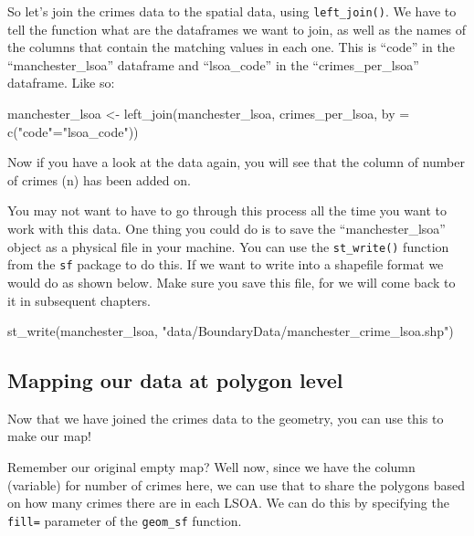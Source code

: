 \documentclass[
]{book}
\newenvironment{Shaded}{\begin{snugshade}}{\end{snugshade}}
\newcommand{\AttributeTok}[1]{\textcolor[rgb]{0.77,0.63,0.00}{#1}}
\newcommand{\FunctionTok}[1]{\textcolor[rgb]{0.00,0.00,0.00}{#1}}
\newcommand{\NormalTok}[1]{#1}
\newcommand{\OtherTok}[1]{\textcolor[rgb]{0.56,0.35,0.01}{#1}}
\newcommand{\StringTok}[1]{\textcolor[rgb]{0.31,0.60,0.02}{#1}}
\begin{document}
So let's join the crimes data to the spatial data, using \texttt{left\_join()}. We have to tell the function what are the dataframes we want to join, as well as the names of the columns that contain the matching values in each one. This is ``code'' in the ``manchester\_lsoa'' dataframe and ``lsoa\_code'' in the ``crimes\_per\_lsoa'' dataframe. Like so:

\begin{Shaded}
\begin{Highlighting}[]
\NormalTok{manchester\_lsoa }\OtherTok{\textless{}{-}} \FunctionTok{left\_join}\NormalTok{(manchester\_lsoa, crimes\_per\_lsoa, }\AttributeTok{by =} \FunctionTok{c}\NormalTok{(}\StringTok{"code"}\OtherTok{=}\StringTok{"lsoa\_code"}\NormalTok{))}
\end{Highlighting}
\end{Shaded}

Now if you have a look at the data again, you will see that the column of number of crimes (n) has been added on.

You may not want to have to go through this process all the time you want to work with this data. One thing you could do is to save the ``manchester\_lsoa'' object as a physical file in your machine. You can use the \texttt{st\_write()} function from the \texttt{sf} package to do this. If we want to write into a shapefile format we would do as shown below. Make sure you save this file, for we will come back to it in subsequent chapters.

\begin{Shaded}
\begin{Highlighting}[]
\FunctionTok{st\_write}\NormalTok{(manchester\_lsoa, }\StringTok{"data/BoundaryData/manchester\_crime\_lsoa.shp"}\NormalTok{)}
\end{Highlighting}
\end{Shaded}

\hypertarget{mapping-our-data-at-polygon-level}{%
\subsection{Mapping our data at polygon level}\label{mapping-our-data-at-polygon-level}}

Now that we have joined the crimes data to the geometry, you can use this to make our map!

Remember our original empty map? Well now, since we have the column (variable) for number of crimes here, we can use that to share the polygons based on how many crimes there are in each LSOA. We can do this by specifying the \texttt{fill=} parameter of the \texttt{geom\_sf} function.
\end{document}

